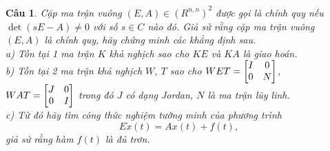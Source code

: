 \documentclass[11pt]{article}
\newtheorem{bt}{Câu}
\begin{document}
\pagebreak

\begin{bt}
Cặp ma trận vuông $(E,A) \in (R^{n,n})^2$ được gọi là chính quy nếu $\det(sE-A) \not= 0$ với số $s\in C$ nào đó. Giả sử rằng cặp ma trận vuông $(E,A)$ là chính quy, hãy chứng minh các khẳng định sau. \\
a) Tồn tại 1 ma trận $K$ khả nghịch sao cho $KE$ và $KA$ là giao hoán. \\
b) Tồn tại 2 ma trận khả nghịch $W$, $T$ sao cho $WET = \begin{bmatrix} I & 0 \\ 0 & N \end{bmatrix}$, $WAT = \begin{bmatrix} J & 0\\ 0 & I \end{bmatrix}$ trong đó $J$ có dạng Jordan, $N$ là ma trận lũy linh. \\
c) Từ đó hãy tìm công thức nghiệm tường minh của phương trình 
%
\[
E \dot{x}(t) = A x(t) + f(t), 
\]
%
giả sử rằng hàm $f(t)$ là đủ trơn.
\end{bt}
\end{document}
